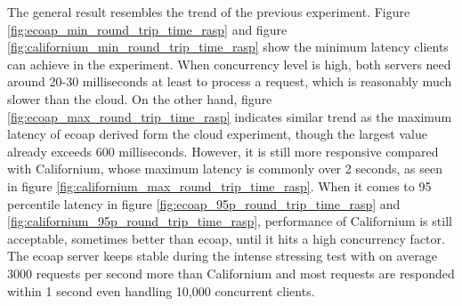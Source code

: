 The general result resembles the trend of the previous experiment. Figure \ref{fig:ecoap_min_round_trip_time_rasp} and figure \ref{fig:californium_min_round_trip_time_rasp} show the minimum latency clients can achieve in the experiment. When concurrency level is high, both servers need around 20-30 milliseconds at least to process a request, which is reasonably much slower than the cloud.
On the other hand, figure \ref{fig:ecoap_max_round_trip_time_rasp} indicates similar trend as the maximum latency of ecoap derived form the cloud experiment, though the largest value already exceeds 600 milliseconds. However, it is still more responsive compared with Californium, whose maximum latency is commonly over 2 seconds, as seen in figure \ref{fig:californium_max_round_trip_time_rasp}. When it comes to 95 percentile latency in figure \ref{fig:ecoap_95p_round_trip_time_rasp} and \ref{fig:californium_95p_round_trip_time_rasp}, performance of Californium is still acceptable, sometimes better than ecoap, until it hits a high concurrency factor. The ecoap server keeps stable during the intense stressing test with on average 3000 requests per second more than Californium and most requests are responded within 1 second even handling 10,000 concurrent clients.

